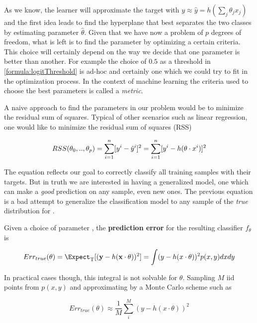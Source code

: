 
As we know, the learner will approximate the target with $y \approx \hat{y} = h\left(\sum_{j}\theta_jx_j\right)$ and the first idea leads to find the hyperplane that best separates the two classes by estimating parameter $\hat{\theta}$. Given that we have now a problem of $p$ degrees of freedom, what is left is to find the parameter by optimizing a certain criteria. This choice will certainly depend on the way we decide that one parameter is better than another. For example the choice of $0.5$ as a threshold in \ref{formula:logitThreshold} is ad-hoc and certainly one which we could try to fit in the optimization process. In the context of machine learning the criteria used to choose the best parameters is called a \textit{metric}.

A naive approach to find the parameters in our problem would be to minimize the residual sum of squares. Typical of other scenarios such as linear regression, one would like to minimize the residual sum of squares (RSS)  

\begin{equation} \label{eq:rss}
RSS(\theta_0,..,\theta_p)  = \sum_{i=1}^n [y^i - \hat{y}^i]^2  \\
=  \sum_{i=1}^n [y^i - h( \theta \cdot x^i)]^2
\end{equation}

The equation reflects our goal to correctly classify all training samples with their targets. But in truth we are interested in having a generalized model, one which can make a \textit{good} prediction on any sample, even new ones. The previous equation is a bad attempt to generalize the classification model to any sample of the \textit{true} distribution for . 

Given a choice of parameter \theta, the \textbf{prediction error} for the resulting classifier $f_\theta$ is

\[
    Err_{true}(\theta)  = \Expect_{ \mathrm{T}}[(\textbf{y} - h(\textbf{x} \cdot \theta) )^2] \\
    = \int (y - h(x \cdot \theta) )^2 p(x,y)dxdy
\]

In practical cases though, this integral is not solvable for $\theta$. Sampling $M$ iid points from $p(x,y)$ and approximating by a Monte Carlo scheme such as 

\begin{equation} \label{eq:mcarlo-approx}

    Err_{true}(\theta)  \approx \frac{1}{M} \sum_i^M (y - h(x \cdot \theta) )^2
\end{equation}

